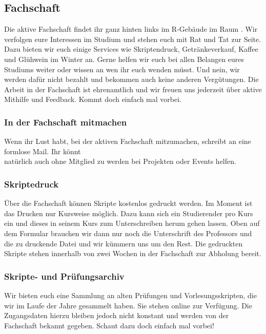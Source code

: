 \subsection{Fachschaft}
Die aktive Fachschaft findet ihr ganz hinten links im R-Gebäude im 
Raum . Wir verfolgen eure Interessen im Studium und stehen 
euch mit Rat und Tat zur Seite. Dazu bieten wir euch einige Services wie 
Skriptendruck, Getränkeverkauf, Kaffee und Glühwein im Winter an.\doublebreak
Gerne helfen wir euch bei allen Belangen eures 
Studiums weiter oder wissen an wen ihr euch wenden 
müsst. Und nein, wir werden dafür nicht bezahlt 
und bekommen auch keine anderen Vergütungen. 
Die Arbeit in der Fachschaft ist ehrenamtlich und wir 
freuen uns jederzeit über aktive Mithilfe und Feedback. 
Kommt doch einfach mal vorbei. 

\subsubsection{In der Fachschaft mitmachen}
Wenn ihr Lust habt, bei der aktiven Fachschaft mitzumachen, schreibt an  eine formlose Mail. Ihr könnt\\
natürlich auch ohne Mitglied zu werden bei Projekten oder Events helfen.

\subsubsection{Skriptedruck}
Über die Fachschaft können Skripte kostenlos gedruckt werden. 
Im Moment ist das Drucken nur Kursweise möglich. Dazu kann sich 
ein Studierender pro Kurs ein   und dieses in seinem Kurs zum Unterschreiben 
herum gehen lassen. Oben auf dem Formular brauchen wir dann nur 
noch die Unterschrift des Professors und die zu druckende Datei und 
wir kümmern uns um den Rest. Die gedruckten Skripte stehen innerhalb von zwei
Wochen in der Fachschaft zur Abholung bereit.

\subsubsection{Skripte- und Prüfungsarchiv}
Wir bieten euch eine Sammlung an alten Prüfungen und Vorlesungsskripten, die wir im Laufe der Jahre gesammelt haben. \doublebreak
Sie stehen online zur Verfügung. Die Zugangsdaten hierzu bleiben jedoch nicht konstant und werden von der Fachschaft bekannt
gegeben. Schaut dazu doch einfach mal vorbei!

